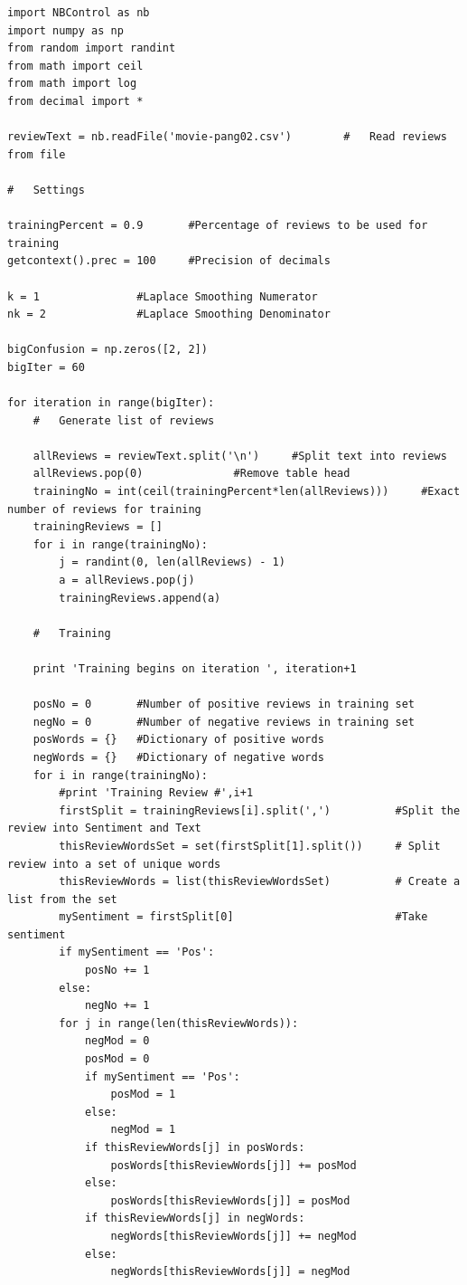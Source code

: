 \documentclass[10pt]{article}
\begin{document}
\begin{lstlisting}
import NBControl as nb
import numpy as np
from random import randint
from math import ceil
from math import log
from decimal import *

reviewText = nb.readFile('movie-pang02.csv')        #   Read reviews from file

#   Settings

trainingPercent = 0.9       #Percentage of reviews to be used for training
getcontext().prec = 100     #Precision of decimals

k = 1               #Laplace Smoothing Numerator
nk = 2              #Laplace Smoothing Denominator

bigConfusion = np.zeros([2, 2])
bigIter = 60

for iteration in range(bigIter):
    #   Generate list of reviews

    allReviews = reviewText.split('\n')     #Split text into reviews
    allReviews.pop(0)              #Remove table head
    trainingNo = int(ceil(trainingPercent*len(allReviews)))     #Exact number of reviews for training
    trainingReviews = []
    for i in range(trainingNo):
        j = randint(0, len(allReviews) - 1)
        a = allReviews.pop(j)
        trainingReviews.append(a)

    #   Training

    print 'Training begins on iteration ', iteration+1

    posNo = 0       #Number of positive reviews in training set
    negNo = 0       #Number of negative reviews in training set
    posWords = {}   #Dictionary of positive words
    negWords = {}   #Dictionary of negative words
    for i in range(trainingNo):
        #print 'Training Review #',i+1
        firstSplit = trainingReviews[i].split(',')          #Split the review into Sentiment and Text
        thisReviewWordsSet = set(firstSplit[1].split())     # Split review into a set of unique words
        thisReviewWords = list(thisReviewWordsSet)          # Create a list from the set
        mySentiment = firstSplit[0]                         #Take sentiment
        if mySentiment == 'Pos':
            posNo += 1
        else:
            negNo += 1
        for j in range(len(thisReviewWords)):
            negMod = 0
            posMod = 0
            if mySentiment == 'Pos':
                posMod = 1
            else:
                negMod = 1
            if thisReviewWords[j] in posWords:
                posWords[thisReviewWords[j]] += posMod
            else:
                posWords[thisReviewWords[j]] = posMod
            if thisReviewWords[j] in negWords:
                negWords[thisReviewWords[j]] += negMod
            else:
                negWords[thisReviewWords[j]] = negMod


\end{lstlisting}
\end{document}
